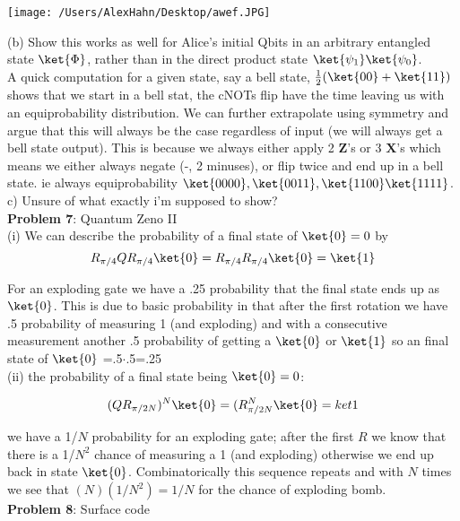 \begin{center}
\texttt{[image: /Users/AlexHahn/Desktop/awef.JPG]}
\end{center}


(b) Show this works as well for Alice's initial Qbits in an arbitrary
entangled state $\ket{\Phi}$, rather than in the direct product state
$\ket{\psi_1}\ket{\psi_0}$.\\

A quick computation for a given state, say a bell state,
$\frac{1}{2}(\ket{00}+\ket{11})$ shows that we start in a bell stat, the
cNOTs flip have the time leaving us with an equiprobability
distribution. We can further extrapolate using symmetry and argue that this
will always be the case regardless of input (we will always get a bell state
output). This is because we always either apply 2 $\textbf{Z}$'s or 3
$\textbf{X}$'s which means we either always negate (-, 2 minuses), or flip
twice and end up in a bell state. ie always equiprobability
$\ket{0000},\ket{0011},\ket{1100}\ket{1111}$.\\

c) Unsure of what exactly i'm supposed to show?\\


\textbf{Problem 7}: Quantum Zeno II\\

(i) We can describe the probability of a final state of $\ket{0}=0$ by
$$R_{\pi/4}QR_{\pi/4}\ket{0}=R_{\pi/4}R_{\pi/4}\ket{0}=\ket{1}$$

For an exploding gate we have a .25 probability that the final state ends up
as $\ket{0}$. This is due to basic probability in that after the first rotation
we have .5 probability of measuring 1 (and exploding) and with a
consecutive measurement another .5 probability of getting a $\ket{0}$ or
$\ket{1}$ so an final state of $\ket{0}$ =.5$\cdot$.5=.25\\

(ii) the probability of a final state being $\ket{0}=0$:

$$(QR_{\pi/2N})^N\ket{0}=(R_{\pi/2N}^N\ket{0}=ket{1}$$

we have a 1/$N$ probability for an exploding gate; after the first $R$ we know
that there is a 1/$N^2$ chance of measuring a 1 (and exploding)
otherwise we end up back in state $\ket{0}$. Combinatorically this sequence
repeats and with $N$ times we see that $(N)(1/N^2)=1/N$ for the chance of
exploding bomb.\\


\textbf{Problem 8}: Surface code\\

